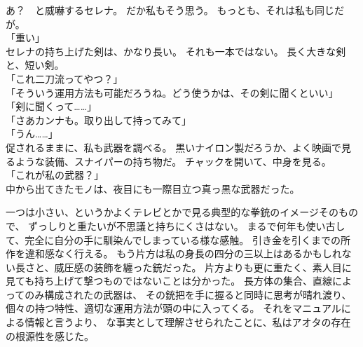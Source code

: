 \documentclass[../IHMain]{subfiles}
\begin{document}
あ？　と威嚇するセレナ。
だか私もそう思う。
もっとも、それは私も同じだが。\\
「重い」\\
セレナの持ち上げた剣は、かなり長い。
それも一本ではない。
長く大きな剣と、短い剣。\\
「これ二刀流ってやつ？」\\
「そういう運用方法も可能だろうね。どう使うかは、その剣に聞くといい」\\
「剣に聞くって……」\\
「さあカンナも。取り出して持ってみて」\\
「うん……」\\
促されるままに、私も武器を調べる。
黒いナイロン製だろうか、よく映画で見るような装備、スナイパーの持ち物だ。
チャックを開いて、中身を見る。\\
「これが私の武器？」\\
中から出てきたモノは、夜目にも一際目立つ真っ黒な武器だった。

一つは小さい、というかよくテレビとかで見る典型的な拳銃のイメージそのもので、
ずっしりと重たいが不思議と持ちにくさはない。
まるで何年も使い古して、完全に自分の手に馴染んでしまっている様な感触。
引き金を引くまでの所作を違和感なく行える。
もう片方は私の身長の四分の三以上はあるかもしれない長さと、威圧感の装飾を纏った銃だった。
片方よりも更に重たく、素人目に見ても持ち上げて撃つものではないことは分かった。
長方体の集合、直線によってのみ構成されたの武器は、
その銃把を手に握ると同時に思考が晴れ渡り、
個々の持つ特性、適切な運用方法が頭の中に入ってくる。
それをマニュアルによる情報と言うより、
な事実として理解させられたことに、私はアオタの存在の根源性を感じた。
\end{document}
